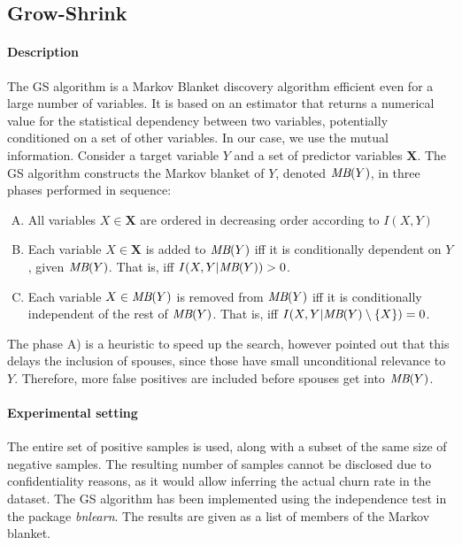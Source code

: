 \subsection{Grow-Shrink}

\paragraph{Description} The GS algorithm \parencite{margaritis2000bayesian} is a
Markov Blanket discovery algorithm efficient even for a large number of
variables. It is based on an estimator that returns a numerical value for the
statistical dependency between two variables, potentially conditioned on a set
of other variables. In our case, we use the mutual information. Consider a
target variable $Y$ and a set of predictor variables $\bm X$. The GS algorithm
constructs the Markov blanket of $Y$, denoted $\textit{MB}(Y)$, in three phases
performed in sequence:

\begin{enumerate}[A)]
    \item All variables $X\in\bm X$ are ordered in decreasing order according to
    $I(X, Y)$
    \item Each variable $X\in\bm X$ is added to $\textit{MB}(Y)$ iff it is
    conditionally dependent on $Y$, given $\textit{MB}(Y)$. That is, iff $I(X,
    Y|\textit{MB}(Y)) > 0$.
    \item Each variable $X\in\textit{MB}(Y)$ is removed from $\textit{MB}(Y)$
    iff it is conditionally independent of the rest of $\textit{MB}(Y)$. That
    is, iff $I(X, Y|\textit{MB}(Y)\setminus\{X\}) = 0$.
\end{enumerate}

The phase A) is a heuristic to speed up the search, however
\textcite{tsamardinos2003algorithms} pointed out that this delays the inclusion
of spouses, since those have small unconditional relevance to $Y$. Therefore,
more false positives are included before spouses get into $\textit{MB}(Y)$.

\paragraph{Experimental setting} The entire set of positive samples is used,
along with a subset of the same size of negative samples. The resulting number
of samples cannot be disclosed due to confidentiality reasons, as it would allow
inferring the actual churn rate in the dataset. The GS algorithm has been
implemented using the independence test in the package \emph{bnlearn}. The
results are given as a list of members of the Markov blanket.


